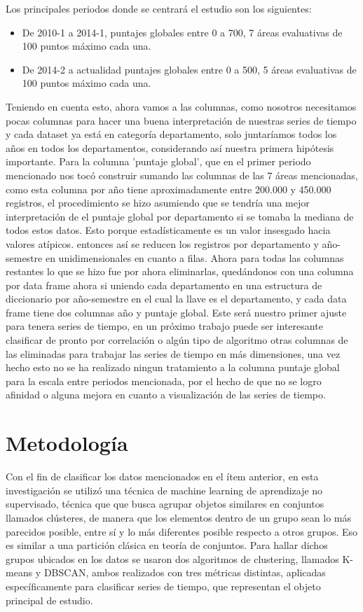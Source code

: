 \documentclass[12pt,a4paper]{article}
\begin{document}
    Los principales periodos donde se centrará el estudio son los siguientes:
    \begin{itemize}
        \item De 2010-1 a 2014-1, puntajes globales entre 0 a 700, 7 áreas evaluativas de 100 puntos máximo cada una.
        \item De 2014-2 a actualidad puntajes globales entre 0 a 500, 5 áreas evaluativas de 100 puntos máximo cada una.
    \end{itemize}

    Teniendo en cuenta esto, ahora vamos a las columnas, como nosotros necesitamos pocas columnas para hacer una buena interpretación de nuestras series de tiempo y cada dataset ya está en categoría departamento, solo juntaríamos todos los años en todos los departamentos, considerando así nuestra primera hipótesis importante. Para la columna 'puntaje global', que en el primer periodo mencionado nos tocó construir sumando las columnas de las 7 áreas mencionadas, 
    como esta columna por año tiene aproximadamente entre 200.000 y 450.000 registros, el procedimiento se hizo asumiendo que se tendría una mejor interpretación de el puntaje global por departamento si se tomaba la mediana de todos estos datos. Esto porque estadísticamente es un valor insesgado hacia valores atípicos. entonces
    así se reducen los registros por departamento y año-semestre en unidimensionales en cuanto a filas. Ahora para todas las columnas restantes lo que se hizo fue por ahora eliminarlas, quedándonos con una columna por data frame ahora si uniendo cada departamento en una estructura de diccionario por año-semestre en el cual la llave es el departamento,
    y cada data frame tiene dos columnas año y puntaje global. Este será nuestro primer ajuste para tenera series de tiempo, en un próximo trabajo puede ser interesante clasificar de pronto por correlación o algún tipo de algoritmo otras columnas de las eliminadas
    para trabajar las series de tiempo en más dimensiones, una vez hecho esto no se ha realizado ningun tratamiento a la columna puntaje global para la escala entre periodos mencionada, por el hecho de que no se logro afinidad o alguna mejora en cuanto a visualización de las series de tiempo.

\section{Metodología}

    Con el fin de clasificar los datos mencionados en el ítem anterior, 
    en esta investigación se utilizó una técnica de machine learning de 
    aprendizaje no supervisado, 
    técnica que que busca agrupar objetos similares en conjuntos llamados 
    clústeres, de manera
     que los elementos dentro de un grupo sean lo más parecidos posible,
     entre sí y lo más diferentes posible respecto a otros grupos. Eso es 
     similar a una partición clásica 
     en teoría de conjuntos. Para hallar dichos grupos ubicados en los datos
      se usaron dos algoritmos
    de clustering, llamados K-means y DBSCAN, ambos realizados con tres métricas
     distintas, aplicadas específicamente para clasificar series de tiempo, que representan el objeto principal de estudio.
\end{document}
